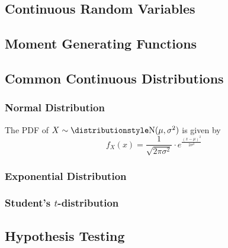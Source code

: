 \subsection{Continuous Random Variables}

\subsection{Moment Generating Functions}

\subsection{Common Continuous Distributions}

\subsubsection{Normal Distribution}


The PDF of \(X \sim \Normal(\mu, \sigma^2)\) is given by
\begin{equation*}
 f_X(x) = \frac 1{\sqrt{2\pi\sigma^2}} \cdot
     e^{\frac{(x - \mu)^2}{2\sigma^2}}
\end{equation*}

\subsubsection{Exponential Distribution}

\subsubsection[Student's \texorpdfstring{\(t\)}{t}-distribution]
              {Student's \boldmath\(t\)-distribution}

\subsection{Hypothesis Testing}

